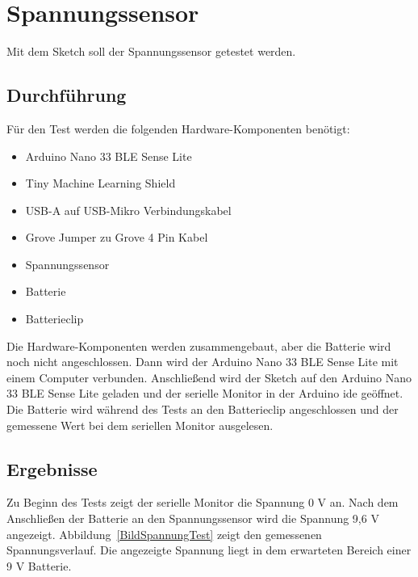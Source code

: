 \section{Spannungssensor}

Mit dem Sketch  soll der Spannungssensor getestet werden.

\begin{code}[h]
\end{code}

\subsection{Durchführung}

Für den Test werden die folgenden Hardware-Komponenten benötigt:

\begin{itemize}
    \item Arduino Nano 33 BLE Sense Lite
    \item Tiny Machine Learning Shield
    \item USB-A auf USB-Mikro Verbindungskabel
    \item Grove Jumper zu Grove 4 Pin Kabel
    \item Spannungssensor
    \item Batterie
    \item Batterieclip
\end{itemize}

Die Hardware-Komponenten werden  zusammengebaut, aber die Batterie wird noch nicht angeschlossen. Dann wird der Arduino Nano 33 BLE Sense Lite mit einem Computer verbunden. Anschließend wird der Sketch  auf den Arduino Nano 33 BLE Sense Lite geladen und der serielle Monitor in der Arduino \acs{ide} geöffnet. Die Batterie wird während des Tests an den Batterieclip angeschlossen und der gemessene Wert bei dem seriellen Monitor ausgelesen.

\subsection{Ergebnisse}

Zu Beginn des Tests zeigt der serielle Monitor die Spannung 0 V an. Nach dem Anschließen der Batterie an den Spannungssensor wird die Spannung 9,6 V angezeigt.  Abbildung~\ref{BildSpannungTest} zeigt den gemessenen Spannungsverlauf. Die angezeigte Spannung liegt in dem erwarteten Bereich einer 9 V Batterie.


